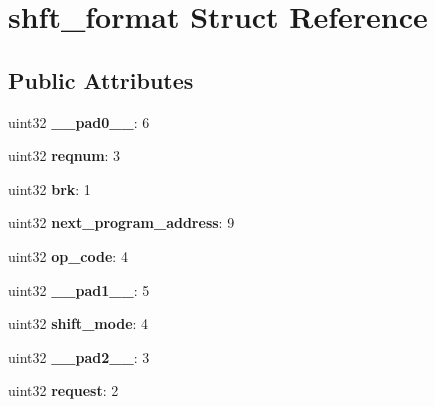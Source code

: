 \hypertarget{structshft__format}{}\section{shft\+\_\+format Struct Reference}
\label{structshft__format}
\subsection*{Public Attributes}
\begin{DoxyCompactItemize}
\item 
\mbox{\label{structshft__format_ab47c09700e61fe8b377d5ff23182e9dc}} 
uint32 {\bfseries \+\_\+\+\_\+pad0\+\_\+\+\_\+}\+: 6
\item 
\mbox{\label{structshft__format_a51852172584e38c48786025adbf20458}} 
uint32 {\bfseries reqnum}\+: 3
\item 
\mbox{\label{structshft__format_aff64a47b28a80f6fd15926128f321571}} 
uint32 {\bfseries brk}\+: 1
\item 
\mbox{\label{structshft__format_a5dd6704772edc606ce1554467cf3fc6c}} 
uint32 {\bfseries next\+\_\+program\+\_\+address}\+: 9
\item 
\mbox{\label{structshft__format_a877cea48df9fdd2b4d60fc23f89166f2}} 
uint32 {\bfseries op\+\_\+code}\+: 4
\item 
\mbox{\label{structshft__format_aac24665271c572f4fe5106b969efee7b}} 
uint32 {\bfseries \+\_\+\+\_\+pad1\+\_\+\+\_\+}\+: 5
\item 
\mbox{\label{structshft__format_a144a2179cecb4d1bb798dfec757f918d}} 
uint32 {\bfseries shift\+\_\+mode}\+: 4
\item 
\mbox{\label{structshft__format_adb07dab4d61b3e9aa7f65c21e957ae56}} 
uint32 {\bfseries \+\_\+\+\_\+pad2\+\_\+\+\_\+}\+: 3
\item 
\mbox{\label{structshft__format_aafdb11480939f21ad140832fb4806cac}} 
uint32 {\bfseries request}\+: 2
\item 

\end{DoxyCompactItemize}
